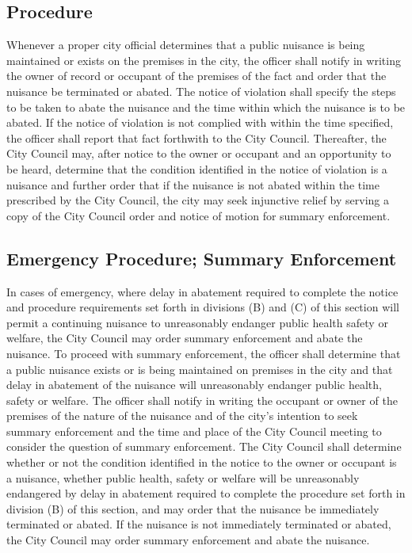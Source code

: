 \subsection{Procedure}
Whenever a proper city official determines that a public nuisance is being maintained or exists on the premises in the city, the officer shall notify in writing the owner of record or occupant of the premises of the fact and order that the nuisance be terminated or abated.  The notice of violation shall specify the steps to be taken to abate the nuisance and the time within which the nuisance is to be abated.  If the notice of violation is not complied with within the time specified, the officer shall report that fact forthwith to the City Council.  Thereafter, the City Council may, after notice to the owner or occupant and an opportunity to be heard, determine that the condition identified in the notice of violation is a nuisance and further order that if the nuisance is not abated within the time prescribed by the City Council, the city may seek injunctive relief by serving a copy of the City Council order and notice of motion for summary enforcement.
\subsection{Emergency Procedure; Summary Enforcement}
In cases of emergency, where delay in abatement required to complete the notice and procedure requirements set forth in divisions (B) and (C) of this section will permit a continuing nuisance to unreasonably endanger public health safety or welfare, the City Council may order summary enforcement and abate the nuisance.  To proceed with summary enforcement, the officer shall determine that a public nuisance exists or is being maintained on premises in the city and that delay in abatement of the nuisance will unreasonably endanger public health, safety or welfare.  The officer shall notify in writing the occupant or owner of the premises of the nature of the nuisance and of the city’s intention to seek summary enforcement and the time and place of the City Council meeting to consider the question of summary enforcement.  The City Council shall determine whether or not the condition identified in the notice to the owner or occupant is a nuisance, whether public health, safety or welfare will be unreasonably endangered by delay in abatement required to complete the procedure set forth in division (B) of this section, and may order that the nuisance be immediately terminated or abated.  If the nuisance is not immediately terminated or abated, the City Council may order summary enforcement and abate the nuisance.
